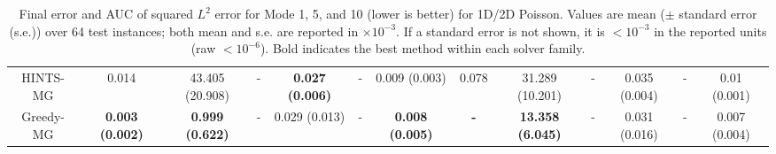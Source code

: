 \documentclass{article} %
\begin{document}
\begin{table}[]
{\begin{tabular}{|c|c|c|c|c|c|c|c|c|c|c|c|c|}
        HINTS-MG & 0.014 & 43.405 (20.908) & - & \textbf{0.027 (0.006)} & - & 0.009 (0.003) & 0.078 & 31.289 (10.201) & - & 0.035 (0.004) & - & 0.01 (0.001)\\
        Greedy-MG & \textbf{0.003 (0.002)} & \textbf{0.999 (0.622)} & - & 0.029 (0.013) & - & \textbf{0.008 (0.005)} & \textbf{-} & \textbf{13.358 (6.045)} & - & 0.031 (0.016) & - & 0.007 (0.004) \\
         \hline
    \end{tabular}
    }
    \caption{Final error and AUC of squared $L^2$ error for Mode 1, 5, and 10 (lower is better) for 1D/2D Poisson. Values are mean ($\pm$ standard error (s.e.)) over 64 test instances; both mean and s.e. are reported in $\times 10^{-3}$. If a standard error is not shown, it is $< 10^{-3}$ in the reported units (raw $< 10^{-6}$). Bold indicates the best method within each solver family.}
    \label{tab:modecomparisonPoisson}
\end{table}
\end{document}
